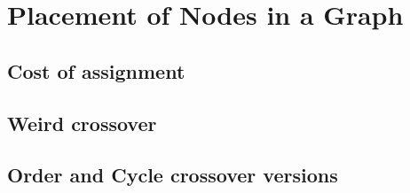 \section{Placement of Nodes in a Graph}

\subsection{Cost of assignment}

\subsection{Weird crossover}

\subsection{Order and Cycle crossover versions}

